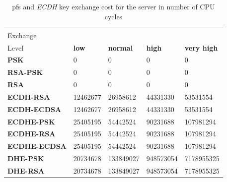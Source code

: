   \begin{table}[]
  \begin{tabular}{|l|l|l|l|l|}
  \hline
   \backslashbox{Key\\Exchange}{Security\\Level}                                           & \textbf{low}                    & \textbf{normal}                 & \textbf{high}                   & \textbf{very high}              \\ \hline
  \textbf{PSK}                               & 0                               & 0                               & 0                               & 0                               \\ \hline
  \textbf{RSA-PSK}                           & 0                               & 0                               & 0                               & 0                               \\ \hline
  \textbf{RSA}                               & 0                               & 0                               & 0                               & 0                               \\ \hline
  \rowcolor[HTML]{9B9B9B}
  {\color[HTML]{333333} \textbf{ECDH-RSA}}   & {\color[HTML]{333333} 12462677} & {\color[HTML]{333333} 26958612} & {\color[HTML]{333333} 44331330} & {\color[HTML]{333333} 53531554} \\ \hline
  \rowcolor[HTML]{9B9B9B}
  {\color[HTML]{333333} \textbf{ECDH-ECDSA}} & {\color[HTML]{333333} 12462677} & {\color[HTML]{333333} 26958612} & {\color[HTML]{333333} 44331330} & {\color[HTML]{333333} 53531554} \\ \hline
  \textbf{ECDHE-PSK}                         & 25405195                        & 54442524                        & 90231688                        & 107981294                       \\ \hline
  \textbf{ECDHE-RSA}                         & 25405195                        & 54442524                        & 90231688                        & 107981294                       \\ \hline
  \textbf{ECDHE-ECDSA}                       & 25405195                        & 54442524                        & 90231688                        & 107981294                       \\ \hline
  \textbf{DHE-PSK}                           & 20734678                        & 133849027                       & 948573054                        & 7178955325                       \\ \hline
  \textbf{DHE-RSA}                           & 20734678                        & 133849027                       & 948573054                        & 7178955325                       \\ \hline
  \end{tabular}
  \centering \caption{\label{table:pfs-cost-server} \gls{pfs} and \textit{ECDH} key exchange cost for the server in number of CPU cycles}
  \end{table}
  
